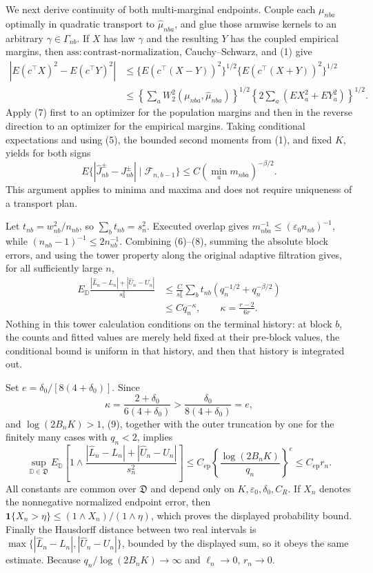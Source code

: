 We next derive continuity of both multi-marginal endpoints.  Couple each \(\mu_{nba}\) optimally in quadratic transport to \(\widehat\mu_{nba}\), and glue those armwise kernels to an arbitrary \(\gamma\in\Gamma_{nb}\).  If \(X\) has law \(\gamma\) and the resulting \(Y\) has the coupled empirical margins, then \(\mathrm{ass:contrast\text{-}normalization}\), Cauchy--Schwarz, and (1) give
\[
 \begin{aligned}
 |E(c^\top X)^2-E(c^\top Y)^2|
 &\le\{E(c^\top(X-Y))^2\}^{1/2}\{E(c^\top(X+Y))^2\}^{1/2}\\
 &\le\left\{\sum_aW_2^2(\mu_{nba},\widehat\mu_{nba})\right\}^{1/2}
       \left\{2\sum_a(E X_a^2+E Y_a^2)\right\}^{1/2}.
 \end{aligned}\tag{7}
\]
Apply (7) first to an optimizer for the population margins and then in the reverse direction to an optimizer for the empirical margins.  Taking conditional expectations and using (5), the bounded second moments from (1), and fixed \(K\), yields for both signs
\[
 E\{|\widehat J_{nb}^{\pm}-J_{nb}^{\pm}|\mid\mathcal F_{n,b-1}\}
 \le C\left(\min_a m_{nba}\right)^{-\beta/2}. \tag{8}
\]
This argument applies to minima and maxima and does not require uniqueness of a transport plan.

Let \(t_{nb}=w_{nb}^2/n_{nb}\), so \(\sum_bt_{nb}=s_n^2\).  Executed overlap gives \(m_{nba}^{-1}\le(\varepsilon_0n_{nb})^{-1}\), while \((n_{nb}-1)^{-1}\le2n_{nb}^{-1}\).  Combining (6)--(8), summing the absolute block errors, and using the tower property along the original adaptive filtration gives, for all sufficiently large \(n\),
\[
 \begin{aligned}
 E_{\mathbb D}\frac{|\widehat L_n-L_n|+|\widehat U_n-U_n|}{s_n^2}
 &\le \frac{C}{s_n^2}\sum_bt_{nb}
 \left(q_n^{-1/2}+q_n^{-\beta/2}\right)\\
 &\le Cq_n^{-\kappa},\qquad
 \kappa=\frac{r-2}{6r}.
 \end{aligned}\tag{9}
\]
Nothing in this tower calculation conditions on the terminal history: at block \(b\), the counts and fitted values are merely held fixed at their pre-block values, the conditional bound is uniform in that history, and then that history is integrated out.

Set \(e=\delta_0/[8(4+\delta_0)]\).  Since
\[
 \kappa=\frac{2+\delta_0}{6(4+\delta_0)}>\frac{\delta_0}{8(4+\delta_0)}=e,
\]
and \(\log(2B_nK)>1\), (9), together with the outer truncation by one for the finitely many cases with \(q_n<2\), implies
\[
 \sup_{\mathbb D\in\mathfrak D}E_{\mathbb D}\left[1\wedge
 \frac{|\widehat L_n-L_n|+|\widehat U_n-U_n|}{s_n^2}\right]
 \le C_{\mathrm{ep}}\left\{\frac{\log(2B_nK)}{q_n}\right\}^{e}
 \le C_{\mathrm{ep}}r_n.
\]
All constants are common over \(\mathfrak D\) and depend only on \(K,\varepsilon_0,\delta_0,C_R\).  If \(X_n\) denotes the nonnegative normalized endpoint error, then
\(\mathbf 1\{X_n>\eta\}\le(1\wedge X_n)/(1\wedge\eta)\), which proves the displayed probability bound.  Finally the Hausdorff distance between two real intervals is
\(\max\{|\widehat L_n-L_n|,|\widehat U_n-U_n|\}\), bounded by the displayed sum, so it obeys the same estimate.  Because \(q_n/\log(2B_nK)\to\infty\) and \(\ell_n\to0\), \(r_n\to0\).